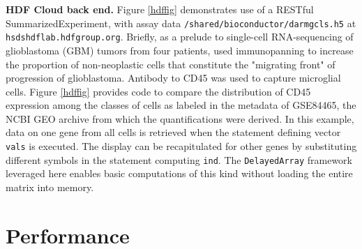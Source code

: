 \documentclass[applications]{gen-bioinformatics}
\newcommand{\Rpackage}[1]{{\textit{#1}}}
\begin{document}
\noindent
\textbf{HDF Cloud back end.}  Figure \ref{hdffig}
demonstrates use of a RESTful SummarizedExperiment,
with assay data \texttt{/shared/bioconductor/darmgcls.h5}
at \texttt{hsdshdflab.hdfgroup.org}.  Briefly, as a
prelude to single-cell RNA-sequencing of glioblastoma (GBM)
tumors from four patients,
\cite{Darmanis2017} used immunopanning to increase the
proportion of non-neoplastic cells that constitute
the "migrating front" of progression of glioblastoma.
Antibody to CD45 was used to capture microglial cells.
Figure \ref{hdffig} provides code to compare
the distribution of CD45 expression among the
classes of
cells as labeled in the metadata of GSE84465,
the NCBI GEO archive from which the quantifications
were derived.  In this example, data on one
gene from all cells
is retrieved when the statement defining vector \texttt{vals}
is executed.  The display can be recapitulated for
other genes by substituting different symbols in
the statement computing \texttt{ind}.
The \verb+DelayedArray+ framework leveraged here
enables basic computations of this kind without loading the
entire matrix into memory.

\noindent



\section*{Performance}
\end{document}
